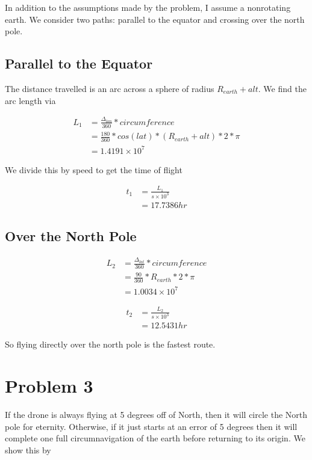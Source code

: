 \documentclass[]{article}
\begin{document}
In addition to the assumptions made by the problem, I assume a nonrotating earth.
We consider two paths: parallel to the equator and crossing over the north pole.

\subsection{Parallel to the Equator}

The distance travelled is an arc across a sphere of radius $R_{earth} + alt$.
We find the arc length via

\begin{align*}
	L_1 &= \frac{\Delta_{lon}}{360} * circumference \\
	&= \frac{180}{360} * cos(lat) * (R_{earth} + alt) * 2 * \pi \\
	&= 1.4191 \times 10^7
\end{align*}

We divide this by speed to get the time of flight

\begin{align*}
	t_1 &= \frac{L_1}{s \times 10^3} \\
	&= 17.7386 hr
\end{align*}

\subsection{Over the North Pole}

\begin{align*}
	L_2 &= \frac{\Delta_{lat}}{360} * circumference \\
	&= \frac{90}{360} * R_{earth} * 2 * \pi \\
	&= 1.0034 \times 10^7
\end{align*}

\begin{align*}
	t_2 &= \frac{L_2}{s \times 10^3} \\
	&= 12.5431hr
\end{align*}

So flying directly over the north pole is the fastest route.

\section{Problem 3}

If the drone is always flying at 5 degrees off of North, then it will circle the North pole for eternity.
Otherwise, if it just starts at an error of 5 degrees then it will complete one full circumnavigation of the earth before returning to its origin.
We show this by
\end{document}

